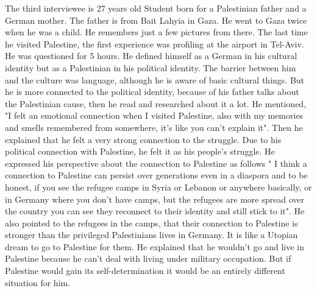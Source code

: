 The third interviewee is 27 years old Student born for a Palestinian father and a German mother. The father is from Bait Lahyia in Gaza. He went to Gaza twice when he was a child. He remembers just a few pictures from there. The last time he visited Palestine, the first experience was profiling at the airport in Tel-Aviv. He was questioned for 5 hours. He defined himself as a German in his cultural identity but as a Palestinian in his political identity. The barrier between him and the culture was language, although he is aware of basic cultural things. But he is more connected to the political identity, because of his father talks about the Palestinian cause, then he read and researched about it a lot. He mentioned, "I felt an emotional connection when I visited Palestine, also with my memories and smells remembered from somewhere, it's like you can't explain it". Then he explained that he felt a very strong connection to the struggle. Due to his political connection with Palestine, he felt it as his people's struggle. He expressed his perspective about the connection to Palestine as follows " I think a connection to Palestine can persist over generations even in a diaspora and to be honest, if you see the refugee camps in Syria or Lebanon or anywhere basically, or in Germany where you don’t have camps, but the refugees are more spread over the country you can see they reconnect to their identity and still stick to it". He also pointed to the refugees in the camps, that their connection to Palestine is stronger than the privileged Palestinians lives in Germany. It is like a Utopian dream to go to Palestine for them. He explained that he wouldn't go and live in Palestine because he can't deal with living under military occupation. But if Palestine would gain its self-determination it would be an entirely different situation for him.



